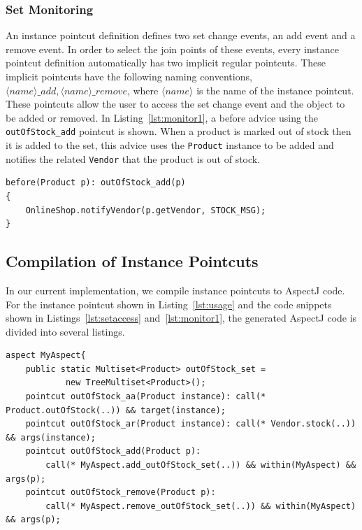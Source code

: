 \documentclass{llncs}
\begin{document}
\subsubsection{Set Monitoring}
An instance pointcut definition defines two set change events, an add event and a remove event. In order to select the join points of these events, every instance pointcut definition automatically has two implicit regular pointcuts. These implicit pointcuts have the following naming conventions, $\langle name \rangle\_add, \langle name \rangle\_remove$, where $\langle name \rangle$ is the name of the instance pointcut. These pointcuts allow the user to access the set change event and the object to be added or removed. In Listing~\ref{lst:monitor1}, a before advice using the \texttt{outOfStock_add} pointcut is shown. When a product is marked out of stock then it is added to the set, this advice uses the \texttt{Product} instance to be added and notifies the related \texttt{Vendor} that the product is out of stock.

\begin{lstlisting}[float=h!, caption={Set monitoring pointcut used to notify vendors}, label={lst:monitor1}]
before(Product p): outOfStock_add(p)
{
	OnlineShop.notifyVendor(p.getVendor, STOCK_MSG);
}
\end{lstlisting}






\subsection{Compilation of Instance Pointcuts}
In our current implementation, we compile instance pointcuts to AspectJ code. For the instance pointcut shown in Listing~\ref{lst:usage} and the code snippets shown in Listings~\ref{lst:setaccess} and~\ref{lst:monitor1}, the generated AspectJ code is divided into several listings.

\begin{lstlisting}[float=h!, caption={The generated AspectJ pointcuts from \texttt{outOfStock} instance pointcut}, label={lst:generated1}]
aspect MyAspect{
	public static Multiset<Product> outOfStock_set =
			new TreeMultiset<Product>();
	pointcut outOfStock_aa(Product instance): call(* Product.outOfStock(..)) && target(instance);
	pointcut outOfStock_ar(Product instance): call(* Vendor.stock(..)) && args(instance);
	pointcut outOfStock_add(Product p): 
		call(* MyAspect.add_outOfStock_set(..)) && within(MyAspect) && args(p);
	pointcut outOfStock_remove(Product p): 
		call(* MyAspect.remove_outOfStock_set(..)) && within(MyAspect) && args(p);
\end{lstlisting}	
\end{document}
